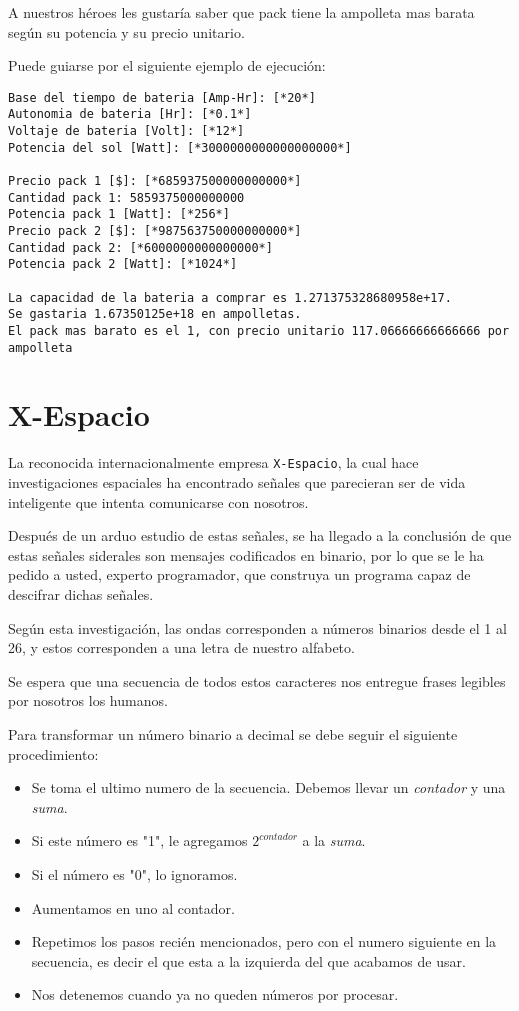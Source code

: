 \documentclass[spanish]{scrartcl}
\begin{document}
A nuestros héroes les gustaría saber que pack tiene la ampolleta mas barata según su potencia y su precio unitario.

Puede guiarse por el siguiente ejemplo de ejecución:

\begin{lstlisting}[style=consola]
Base del tiempo de bateria [Amp-Hr]: [*20*]
Autonomia de bateria [Hr]: [*0.1*]
Voltaje de bateria [Volt]: [*12*]
Potencia del sol [Watt]: [*3000000000000000000*]

Precio pack 1 [$]: [*685937500000000000*]
Cantidad pack 1: 5859375000000000
Potencia pack 1 [Watt]: [*256*]
Precio pack 2 [$]: [*987563750000000000*]
Cantidad pack 2: [*6000000000000000*]
Potencia pack 2 [Watt]: [*1024*]

La capacidad de la bateria a comprar es 1.271375328680958e+17.
Se gastaria 1.67350125e+18 en ampolletas.
El pack mas barato es el 1, con precio unitario 117.06666666666666 por ampolleta
\end{lstlisting}
\pagebreak[4]
\section{X-Espacio}

La reconocida internacionalmente empresa \texttt{X-Espacio}, la cual hace investigaciones espaciales ha encontrado señales que parecieran ser de vida inteligente que intenta comunicarse con nosotros.

Después de un arduo estudio de estas señales, se ha llegado a la conclusión de que estas señales siderales son mensajes codificados en binario, por lo que se le ha pedido a usted, experto programador, que construya un programa capaz de descifrar dichas señales.

Según esta investigación, las ondas corresponden a números binarios desde el 1 al 26, y estos corresponden a una letra de nuestro alfabeto.

Se espera que una secuencia de todos estos caracteres nos entregue frases legibles por nosotros los humanos.

Para transformar un número binario a decimal se debe seguir el siguiente procedimiento:

\begin{itemize}
    \item Se toma el ultimo numero de la secuencia. Debemos llevar un \textit{contador} y una \textit{suma}.
    \item Si este número es "1", le agregamos $2^{contador}$ a la \textit{suma}.
    \item Si el número es "0", lo ignoramos.
    \item Aumentamos en uno al contador.
    \item Repetimos los pasos recién mencionados, pero con el numero siguiente en la secuencia, es decir el que esta a la izquierda del que acabamos de usar.
    \item Nos detenemos cuando ya no queden números por procesar.
\end{itemize}
\end{document}

